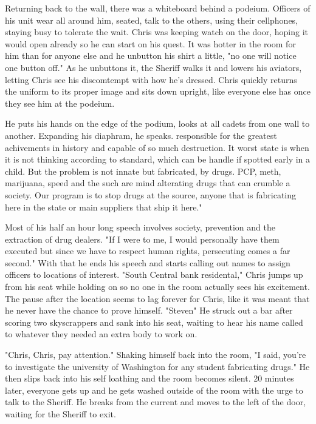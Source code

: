         Returning back to the wall, there was a whiteboard behind a podeium. Officers of his unit wear all around him, seated, talk to the others,
    using their cellphones, staying busy to tolerate the wait. Chris was keeping watch on the door, hoping it would open already so he can start
    on his quest. It was hotter in the room for him than for anyone else and he unbutton his shirt a little, "no one will notice one button off."
    As he unbuttons it, the Sheriff walks it and lowers his aviators, letting Chris see his discomtempt with how he's dressed. Chris quickly
    returns the uniform to its proper image and sits down upright, like everyone else has once they see him at the podeium. 

        He puts his hands on the edge of the podium, looks at all cadets from one wall to another. Expanding his diaphram, he speaks. 
    responsible for the greatest achivements in history and capable of so much destruction. It worst state is when it is not thinking according
    to standard, which can be handle if spotted early in a child. But the problem is not innate but fabricated, by drugs. PCP, meth, marijuana,
    speed and the such are mind alterating drugs that can crumble a society. Our program is to stop drugs at the source, anyone that is
    fabricating here in the state or main suppliers that ship it here."

        Most of his half an hour long speech involves society, prevention and the extraction of drug dealers. "If I were to me, I would 
    personally have them executed but since we have to respect human rights, persecuting comes a far second." With that he ends his speech
    and starts calling out names to assign officers to locations of interest. "South Central bank residental," Chris jumps up from his seat while
    holding on so no one in the room actually sees his excitement. The pause after the location seems to lag forever for Chris, like it was
    meant that he never have the chance to prove himself. "Steven" He struck out a bar after scoring two skyscrappers and sank into his seat,
    waiting to hear his name called to whatever they needed an extra body to work on. 

        "Chris, Chris, pay attention." Shaking himself back into the room, "I said, you're to investigate the university of Washington for any
    student fabricating drugs." He then slips back into his self loathing and the room becomes silent. 20 minutes later, everyone gets up and he
    gets washed outside of the room with the urge to talk to the Sheriff. He breaks from the current and moves to the left of the door, waiting
    for the Sheriff to exit.

